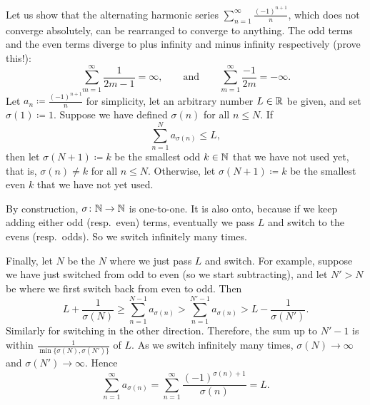 \begin{example} \label{example:harmonsumanything}
Let us show that the alternating harmonic series
$\sum_{n=1}^\infty \frac{{(-1)}^{n+1}}{n}$, which does not converge absolutely, can be
rearranged to converge to anything.
The odd terms and the even terms diverge to
plus infinity and minus infinity respectively (prove this!):
\begin{equation*}
\sum_{m=1}^\infty \frac{1}{2m-1} = \infty, \qquad \text{and} \qquad
\sum_{m=1}^\infty \frac{-1}{2m} = -\infty .
\end{equation*}
Let $a_n \coloneqq \frac{{(-1)}^{n+1}}{n}$ for simplicity, 
let an arbitrary number $L \in {\mathbb{R}}$ be given, and set $\sigma(1) \coloneqq 1$.
Suppose we have
defined $\sigma(n)$ for all $n \leq N$.  If
\begin{equation*}
\sum_{n=1}^N a_{\sigma(n)} \leq L ,
\end{equation*}
then let $\sigma(N+1) \coloneqq k$ be the smallest odd $k \in {\mathbb{N}}$
that we have not used yet,
that is, $\sigma(n) \not= k$ for all $n \leq N$.
Otherwise, let $\sigma(N+1) \coloneqq k$ 
be the smallest even $k$ that we have not yet used.

By construction, $\sigma \colon {\mathbb{N}} \to {\mathbb{N}}$ is one-to-one.
It is also onto, because if we keep adding either odd (resp.\ even) terms,
eventually we pass $L$ and switch
to the evens (resp.\ odds).  So we switch infinitely many times.

Finally, let $N$ be the $N$ where we just pass $L$ and switch.
For example, suppose we have just switched from odd to even (so we start
subtracting),
and let $N' > N$ be where we first switch back from even to odd.  Then
\begin{equation*}
L + \frac{1}{\sigma(N)} \geq \sum_{n=1}^{N-1} a_{\sigma(n)}
> \sum_{n=1}^{N'-1} a_{\sigma(n)} > L- \frac{1}{\sigma(N')}.
\end{equation*}
Similarly for switching in the other direction.
Therefore,
the sum up to $N'-1$ is within $\frac{1}{\min \{ \sigma(N), \sigma(N') \}}$
of $L$.  As
we switch infinitely many times, $\sigma(N) \to \infty$
and $\sigma(N') \to \infty$. Hence
\begin{equation*}
\sum_{n=1}^\infty a_{\sigma(n)} = 
\sum_{n=1}^\infty \frac{{(-1)}^{\sigma(n)+1}}{\sigma(n)} = L .
\end{equation*}


\end{example}
